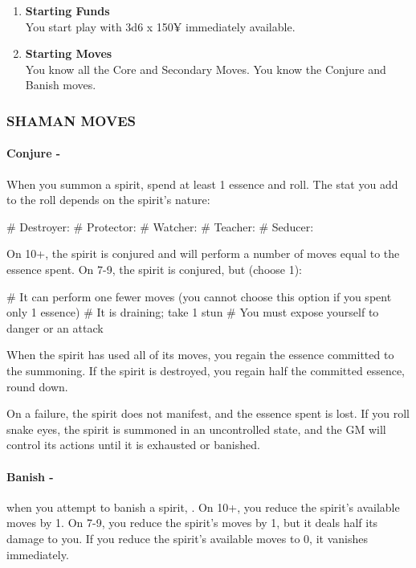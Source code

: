 \begin{enumerate}
    \item \textbf{Starting Funds} \\
    You start play with 3d6 x 150¥ immediately available.
    
    \item \textbf{Starting Moves} \\
    You know all the Core and Secondary Moves. You know the Conjure and Banish moves.
\end{enumerate}

\subsubsection{SHAMAN MOVES}
\paragraph{Conjure -} When you summon a spirit, spend at least 1 essence and roll. The stat you add to the roll depends on the spirit’s nature:
    \begin{easylist}
        # Destroyer: 
        # Protector: 
        # Watcher: 
        # Teacher: 
        # Seducer: 
    \end{easylist}

On 10+, the spirit is conjured and will perform a number of moves equal to the essence spent. On 7-9, the spirit is conjured, but (choose 1):
    \begin{easylist}
        # It can perform one fewer moves (you cannot choose this option if you spent only 1 essence)
        # It is draining; take 1 stun
        # You must expose yourself to danger or an attack
    \end{easylist}

When the spirit has used all of its moves, you regain the essence committed to the summoning. If the spirit is destroyed, you regain half the committed essence, round down.

On a failure, the spirit does not manifest, and the essence spent is lost. If you roll snake eyes, the spirit is summoned in an uncontrolled state, and the GM will control its actions until it is exhausted or banished.

\paragraph{Banish -} when you attempt to banish a spirit, . On 10+, you reduce the spirit’s available moves by 1. On 7-9, you reduce the spirit’s moves by 1, but it deals half its damage to you. If you reduce the spirit’s available moves to 0, it vanishes immediately.

